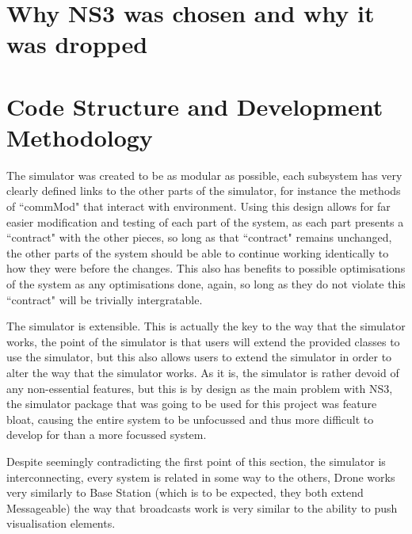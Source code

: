 \section{Why NS3 was chosen and why it was dropped}

\section{Code Structure and Development Methodology}

	The simulator was created to be as modular as possible, each subsystem has very clearly defined
	links to the other parts of the simulator, for instance the methods of ``commMod" that interact
	with environment. Using this design allows for far easier modification and testing of each part
	of the system, as each part presents a ``contract" with the other pieces, so long as that ``contract"
	remains unchanged, the other parts of the system should be able to continue working identically
	to how they were before the changes. This also has benefits to possible optimisations of the system
	as any optimisations done, again, so long as they do not violate this ``contract" will be trivially
	intergratable.

	The simulator is extensible. This is actually the key to the way that the simulator works, the point
	of the simulator is that users will extend the provided classes to use the simulator, but this also
	allows users to extend the simulator in order to alter the way that the simulator works. As it is,
	the simulator is rather devoid of any non-essential features, but this is by design as the main problem
	with NS3, the simulator package that was going to be used for this project was feature bloat, causing
	the entire system to be unfocussed and thus more difficult to develop for than a more focussed system.

	Despite seemingly contradicting the first point of this section, the simulator is interconnecting,
	every system is related in some way to the others, Drone works very similarly to Base Station
	(which is to be expected, they both extend Messageable) the way that broadcasts work is very similar
	to the ability to push visualisation elements.

